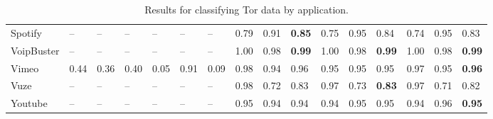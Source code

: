 \begin{table} [ht!]
\begin{tabular} {|p{2cm}|p{0.5cm}p{0.5cm}p{0.5cm}|p{0.5cm}p{0.5cm}p{0.5cm}|p{0.5cm}p{0.5cm}p{0.5cm}|p{0.5cm}p{0.5cm}p{0.5cm}|p{0.5cm}p{0.5cm}p{0.5cm}|}
Spotify & -- & -- & -- & -- & -- & -- & 0.79 & 0.91 & \textbf{0.85} & 0.75 & 0.95 & 0.84 & 0.74 & 0.95 & 0.83 \\
VoipBuster & -- & -- & -- & -- & -- & -- & 1.00 & 0.98 & \textbf{0.99} & 1.00 & 0.98 & \textbf{0.99} & 1.00 & 0.98 & \textbf{0.99} \\
Vimeo & 0.44 & 0.36 & 0.40 & 0.05 & 0.91 & 0.09 & 0.98 & 0.94 & 0.96 & 0.95 & 0.95 & 0.95 & 0.97 & 0.95 & \textbf{0.96} \\
Vuze & -- & -- & -- & -- & -- & -- & 0.98 & 0.72 & 0.83 & 0.97 & 0.73 & \textbf{0.83} & 0.97 & 0.71 & 0.82 \\
Youtube & -- & -- & -- & -- & -- & -- & 0.95 & 0.94 & 0.94 & 0.94 & 0.95 & 0.95 & 0.94 & 0.96 & \textbf{0.95} \\
\hline
\end{tabular}
\caption{Results for classifying Tor data by application.}
\label{tab:torappresults}
\end{table}

